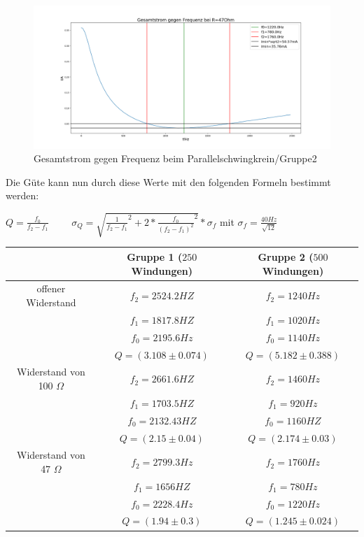 \documentclass[a4paper, 11pt]{article}
\begin{document}
\begin{figure}[H]

	\hskip -2.5cm
	\includegraphics[trim = 0mm 0mm 0mm 0mm,clip, width=20cm]{Bilder/DPParallel47_Breite.png}%
	\caption[Gesamtstrom gegen Frequenz beim Parallelschwingkrein/Gruppe2]{Gesamtstrom gegen Frequenz beim Parallelschwingkrein/Gruppe2}%
	\label{pic:Abbildung 2}%

\end{figure}

Die Güte kann nun durch diese Werte mit den folgenden Formeln bestimmt werden:
\begin{center}
$Q=\frac{f_0}{f_2-f_1}\:\;\;\:\;\;\:\;\; \sigma_Q=\sqrt{\frac{1}{f_2-f_1}^2+2*\frac{f_0}{(f_2-f_1)^2}^2}*\sigma_f$ \newline \newline
mit $\sigma_f=\frac{40Hz}{\sqrt{12}}$
\end{center}


\begin{tabular}{|c|c|c|}
\hline 	$ $ 	&	Gruppe 1 ($250$ Windungen)	&	Gruppe 2 ($500$ Windungen) \\
\hline 	offener Widerstand 	&	$ f_2 =2524.2HZ$					&	$ f_2 = 1240Hz$	\\
\hline 	$ $ 	&	$ f_1 = 1817.8HZ$					&	$ f_1 = 1020Hz$	\\
\hline 	$ $ 	&	$ f_0 = 2195.6Hz$					&	$ f_0 = 1140Hz$	\\
\hline 		&	$ Q = (3.108 \pm 0.074) $	&	$ Q = (5.182 \pm 0.388)  $ \\
\hline	Widerstand von 100 $\Omega$	&	$ f_2 = 2661.6HZ$					&	$ f_2 = 1460Hz$	\\
\hline 	$ $ 	&	$ f_1 = 1703.5HZ$					&	$ f_1 = 920Hz$	\\
\hline 	$ $ 	&	$ f_0 = 2132.43HZ$					&	$ f_0 = 1160HZ$	\\
\hline 		&	$ Q = (2.15 \pm 0.04)$	&	$ Q = (2.174 \pm 0.03)  $ \\
\hline	Widerstand von 47 $\Omega$	&	$ f_2 = 2799.3Hz$					&	$ f_2 = 1760Hz$	\\
\hline 	$ $ 	&	$ f_1 = 1656HZ$					&	$ f_1 = 780Hz$	\\
\hline 	$ $ 	&	$ f_0 = 2228.4Hz$					&	$ f_0 = 1220Hz$	\\
\hline 		&	$ Q = (1.94 \pm 0.3) $	&	$ Q = (1.245 \pm 0.024)  $ \\
\hline	
\end{tabular}
\newpage
\end{document}
